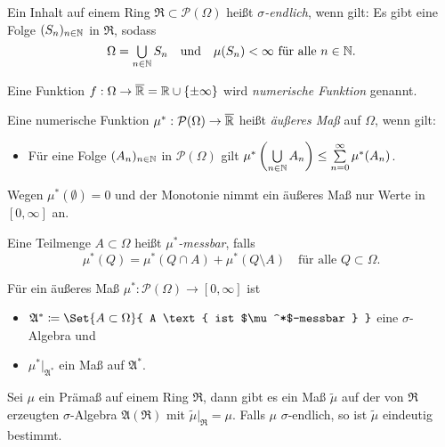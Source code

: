 \documentclass{cheat-sheet}
\newcommand{\PS}{\mathcal{P}} %
\newcommand{\PSO}{\PS(\Omega)} %
\newcommand{\Alg}{\mathfrak{A}} %
\newcommand{\Ring}{\mathfrak{R}} %
\begin{document}
\begin{defn}
  Ein Inhalt auf einem Ring $\Ring \subset \PSO$ heißt \emph{$\sigma$-endlich}, wenn gilt: Es gibt eine Folge $(S_n)_{n \in \mathbb{N}}$ in $\Ring$, sodass
  \[
      \Omega = \bigcup_{n \in \N} S_n
      \quad \text{und} \quad
      \mu(S_n) < \infty \text{ für alle } n \in \N.
  \]
\end{defn}

\begin{defn}
  Eine Funktion $f : \Omega \to \overline{\mathbb{R}} = \mathbb{R} \cup \{ \pm \infty \}$ wird \emph{numerische Funktion} genannt.
\end{defn}

\begin{defn}
  Eine numerische Funktion $\mu^* : \PSO \to \overline{\R}$ heißt \emph{äußeres Maß} auf $\Omega$, wenn gilt:
  \begin{itemize}
    \item Für eine Folge $(A_n)_{n \in \mathbb{N}}$ in $\mathcal{P}(\Omega)$ gilt $\mu^*\left(\bigcup_{n \in \N} A_n \right) \leq \sum_{n = 0}^\infty \mu^*(A_n)$. %
  \end{itemize}
\end{defn}

\begin{bem}
  Wegen $\mu^*(\emptyset) = 0$ und der Monotonie nimmt ein äußeres Maß nur Werte in $[0, \infty]$ an.
\end{bem}

\begin{defn}
  Eine Teilmenge $A \subset \Omega$ heißt \emph{$\mu^*$-messbar}, falls
  \[ \mu^*(Q) = \mu^*(Q \cap A) + \mu^*(Q \setminus A) \quad \text{für alle } Q \subset \Omega. \]
\end{defn}

\begin{satz}[Carathéodory]
  Für ein äußeres Maß $\mu^* : \PSO \to [0, \infty]$ ist
  \begin{itemize}
    \item $\Alg^* \coloneqq \Set{ A \subset \Omega }{ A \text{ ist $\mu^*$-messbar } }$ eine $\sigma$-Algebra und
    \item $\mu^*|_{\Alg^*}$ ein Maß auf $\Alg^*$.
  \end{itemize}
\end{satz}

\begin{satz}
  Sei $\mu$ ein Prämaß auf einem Ring $\Ring$, dann gibt es ein Maß $\tilde{\mu}$ auf der von $\Ring$ erzeugten $\sigma$-Algebra $\Alg(\Ring)$ mit $\tilde{\mu}|_\Ring = \mu$. Falls $\mu$ $\sigma$-endlich, so ist $\tilde{\mu}$ eindeutig bestimmt.
\end{satz}
\end{document}
